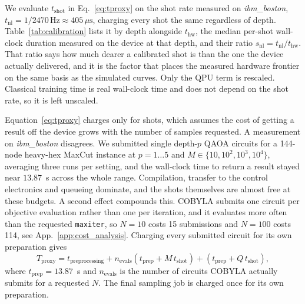 
We evaluate $t_{\text{shot}}$ in Eq.~\eqref{eq:tproxy} on the shot rate measured
on \emph{ibm\_boston}, $t_{\text{nl}} = 1/2470\,\text{Hz} \approx 405\,\mu\text{s}$,
charging every shot the same regardless of depth.
Table~\ref{tab:calibration} lists it by depth alongside $t_{\text{hw}}$, the
median per-shot wall-clock duration measured on the device at that depth, and
their ratio $s_{\text{nl}} = t_{\text{nl}}/t_{\text{hw}}$.
That ratio says how much dearer a calibrated shot is than the one the device
actually delivered, and it is the factor that places the measured hardware
frontier on the same basis as the simulated curves.
Only the QPU term is rescaled. Classical training time is real wall-clock time
and does not depend on the shot rate, so it is left unscaled.



Equation~\eqref{eq:tproxy} charges only for shots, which assumes the cost of
getting a result off the device grows with the number of samples requested.
A measurement on \emph{ibm\_boston} disagrees.
We submitted single depth-$p$ QAOA circuits for a 144-node heavy-hex MaxCut
instance at $p = 1 \dots 5$ and $M \in \{10, 10^2, 10^3, 10^4\}$, averaging
three runs per setting, and the wall-clock time to return a result stayed near
$13.87$~s across the whole range.
Compilation, transfer to the control electronics and queueing dominate, and the
shots themselves are almost free at these budgets.
A second effect compounds this. COBYLA submits one circuit per objective
evaluation rather than one per iteration, and it evaluates more often than the
requested \texttt{maxiter}, so $N = 10$ costs 15 submissions and $N = 100$ costs
114, see App.~\ref{app:cost_analysis}.
Charging every submitted circuit for its own preparation gives
\begin{equation}
    T_{\text{proxy}} = t_{\text{preprocessing}}
    + n_{\text{evals}} \left( t_{\text{prep}} + M \, t_{\text{shot}} \right)
    + \left( t_{\text{prep}} + Q \, t_{\text{shot}} \right),
    \label{eq:tproxy_prep}
\end{equation}
where $t_{\text{prep}} = 13.87$~s and $n_{\text{evals}}$ is the number of
circuits COBYLA actually submits for a requested $N$. The final sampling job is
charged once for its own preparation.


